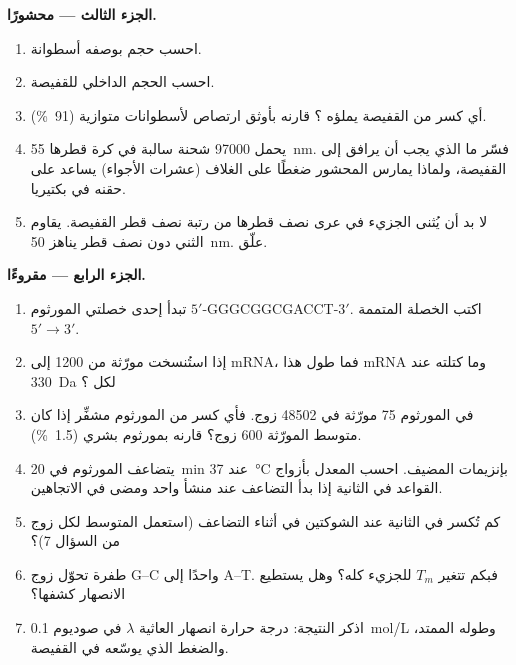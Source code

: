 \begin{problem}
\medskip
\noindent\textbf{الجزء الثالث --- محشورًا.}
\begin{enumerate}[resume]
  \item احسب حجم  بوصفه أسطوانة.
  \item احسب الحجم الداخلي للقفيصة.
  \item أي كسر من القفيصة يملؤه ؟ قارنه بأوثق ارتصاص لأسطوانات
        متوازية (\qty{91}{\%}).
  \item يحمل  \num{97000} شحنة سالبة في كرة قطرها \qty{55}{nm}.
        فسّر ما الذي يجب أن يرافق  إلى القفيصة، ولماذا يمارس
         المحشور ضغطًا على الغلاف (عشرات الأجواء) يساعد على حقنه
        في بكتيريا.
  \item لا بد أن يُثنى الجزيء في عرى نصف قطرها من رتبة نصف قطر
        القفيصة.  يقاوم الثني دون نصف قطر يناهز \qty{50}{nm}.
        علّق.
\end{enumerate}

\medskip
\noindent\textbf{الجزء الرابع --- مقروءًا.}
\begin{enumerate}[resume]
  \item تبدأ إحدى خصلتي المورثوم $5'$-GGGCGGCGACCT-$3'$. اكتب الخصلة
        المتممة $5' \to 3'$.
  \item إذا استُنسخت مورّثة من \num{1200}  إلى mRNA، فما طول
        هذا mRNA  وما كتلته عند \qty{330}{Da} لكل
        ؟
  \item في المورثوم \qty{75}{} مورّثة في \num{48502} زوج. فأي كسر من
        المورثوم مشفِّر إذا كان متوسط المورّثة \num{600} زوج؟ قارنه
        بمورثوم بشري (\qty{1.5}{\%}).
  \item يتضاعف المورثوم في \qty{20}{min} عند \qty{37}{\celsius}
        بإنزيمات المضيف. احسب المعدل بأزواج القواعد في الثانية إذا
        بدأ التضاعف عند منشأ واحد ومضى في الاتجاهين.
  \item كم  تُكسر في الثانية عند الشوكتين في أثناء
        التضاعف (استعمل المتوسط لكل زوج من السؤال 7)؟
  \item طفرة تحوّل زوج G--C واحدًا إلى A--T. فبكم تتغير $T_m$ للجزيء
        كله؟ وهل يستطيع الانصهار كشفها؟
  \item اذكر النتيجة: درجة حرارة انصهار  العاثية $\lambda$ في
        صوديوم \qty{0.1}{mol/L} وطوله الممتد، والضغط الذي يوسّعه في
        القفيصة.
\end{enumerate}
\end{problem}
